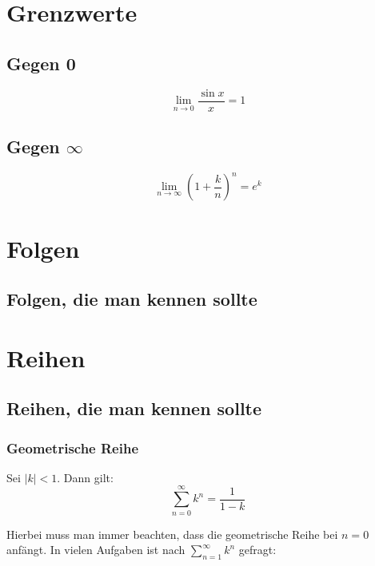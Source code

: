 \documentclass[a4paper, 16pt]{article}
\begin{document}
	\section{Grenzwerte}

	\subsection{Gegen 0}

	\begin{equation*}
		\lim\limits_{n \to 0}{\frac{\sin x}{x}} = 1
	\end{equation*}

	\subsection{Gegen $\infty$}

	\begin{equation*}
		\lim\limits_{n \to \infty}{\left(1 + \frac{k}{n}\right)^n} = e^k
	\end{equation*}

	\section{Folgen}

	\subsection{Folgen, die man kennen sollte}

	\section{Reihen}

	\subsection{Reihen, die man kennen sollte}

	\subsubsection{Geometrische Reihe}

	Sei $|k| < 1$. Dann gilt:
	\begin{equation*}
		\sum\limits_{n = 0}^{\infty}{k^n} = \frac{1}{1 - k}
	\end{equation*}

	Hierbei muss man immer beachten, dass die geometrische Reihe bei $n = 0$ anfängt.
	In vielen Aufgaben ist nach $\sum_{n = 1}^{\infty}{k^n}$ gefragt:
	
\end{document}
